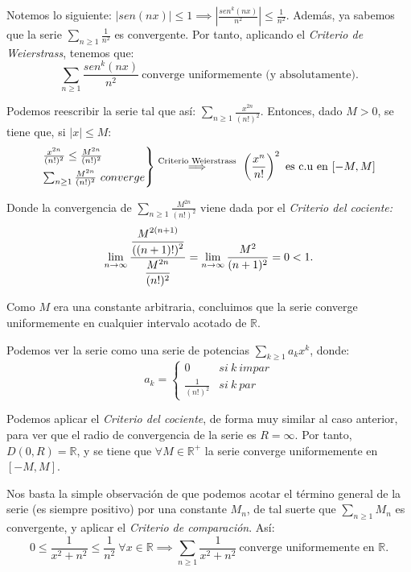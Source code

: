 \begin{sol}[a]
    Notemos lo siguiente: $\displaystyle |sen(nx)| \le 1 \implies \left|\frac{sen^k(nx)}{n^2}\right| \leq \frac{1}{n^2}$. Además, ya sabemos que la serie $\displaystyle \sum_{n \ge 1} \frac{1}{n^2}$ es convergente. Por tanto, aplicando el \textit{Criterio de Weierstrass}, tenemos que: $$\sum_{n\ge1} \frac{sen^k(nx)}{n^2}\ \text{converge uniformemente (y absolutamente).}$$
  \end{sol}

  \begin{sol}[b1] Podemos reescribir la serie tal que así: $\displaystyle \sum_{n\ge1} \frac{x^{2n}}{(n!)^2}$. Entonces, dado $M>0$, se tiene que, si $|x|\le M$:
    $$\begin{rcases}
      \frac{x^{2n}}{(n!)^2} \leq \frac{M^{2n}}{(n!)^2}\\
      \sum_{n\ge 1} \frac{M^{2n}}{(n!)^2} \ converge
    \end{rcases} \overset{\text{Criterio Weierstrass}}{\implies} \ \left(\frac{x^{n}}{n!}\right)^2 \ \text{es c.u en}\ [-M,M]$$

    Donde la convergencia de $\displaystyle \sum_{n\ge 1} \frac{M^{2n}}{(n!)^2}$ viene dada por el \textit{Criterio del cociente:} $$\lim_{n\to\infty}\frac{\displaystyle \frac{\displaystyle M^{2(n+1)}}{\displaystyle ((n+1)!)^2}}{\displaystyle \frac{M^{2n}}{(n!)^2}} = \lim_{n\to\infty} \frac{M^2}{(n+1)^2} = 0 < 1.$$

    Como $M$ era una constante arbitraria, concluimos que la serie converge uniformemente en cualquier intervalo acotado de $\mathbb{R}$.
  \end{sol}

  \begin{sol}[b2] Podemos ver la serie como una serie de potencias $\displaystyle \sum_{k \ge 1} a_kx^k$, donde: $$a_k = \begin{cases} 0 & si \ k \ impar \\ \displaystyle \frac{1}{(n!)^2} & si \ k \ par \end{cases}$$

    Podemos aplicar el \textit{Criterio del cociente}, de forma muy similar al caso anterior, para ver que el radio de convergencia de la serie es $R = \infty$. Por tanto, $D(0,R) = \mathbb{R}$, y se tiene que $\forall M \in \mathbb{R}^+$ la serie converge uniformemente en $[-M,M]$.
  \end{sol}

   \begin{sol}[c]
    Nos basta la simple observación de que podemos acotar el término general de la serie (es siempre positivo) por una constante $M_n$, de tal suerte que $\sum_{n\ge1} M_n$ es convergente, y aplicar el \textit{Criterio de comparación}. Así: $$0 \le \frac{1}{x^2 + n^2} \le \frac{1}{n^2}\ \forall x \in \mathbb{R} \implies \sum_{n\ge 1} \frac{1}{x^2 + n^2} \ \text{converge uniformemente en } \mathbb{R}.$$

  \end{sol}


